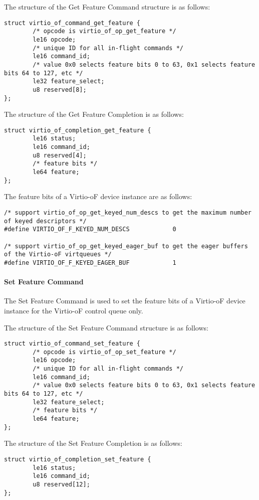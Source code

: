 The structure of the Get Feature Command structure is as follows:
\begin{lstlisting}
struct virtio_of_command_get_feature {
        /* opcode is virtio_of_op_get_feature */
        le16 opcode;
        /* unique ID for all in-flight commands */
        le16 command_id;
        /* value 0x0 selects feature bits 0 to 63, 0x1 selects feature bits 64 to 127, etc */
        le32 feature_select;
        u8 reserved[8];
};
\end{lstlisting}

The structure of the Get Feature Completion is as follows:
\begin{lstlisting}
struct virtio_of_completion_get_feature {
        le16 status;
        le16 command_id;
        u8 reserved[4];
        /* feature bits */
        le64 feature;
};
\end{lstlisting}

The feature bits of a Virtio-oF device instance are as follows:
\begin{lstlisting}
/* support virtio_of_op_get_keyed_num_descs to get the maximum number of keyed descriptors */
#define VIRTIO_OF_F_KEYED_NUM_DESCS            0

/* support virtio_of_op_get_keyed_eager_buf to get the eager buffers of the Virtio-oF virtqueues */
#define VIRTIO_OF_F_KEYED_EAGER_BUF            1
\end{lstlisting}

\paragraph{Set Feature Command}\label{sec:Virtio Transport Options / Virtio Over Fabrics / Commands Definition / Opcodes / Set Feature Command}
The Set Feature Command is used to set the feature bits of a Virtio-oF device instance for the Virtio-oF control queue only.

The structure of the Set Feature Command structure is as follows:
\begin{lstlisting}
struct virtio_of_command_set_feature {
        /* opcode is virtio_of_op_set_feature */
        le16 opcode;
        /* unique ID for all in-flight commands */
        le16 command_id;
        /* value 0x0 selects feature bits 0 to 63, 0x1 selects feature bits 64 to 127, etc */
        le32 feature_select;
        /* feature bits */
        le64 feature;
};
\end{lstlisting}

The structure of the Set Feature Completion is as follows:
\begin{lstlisting}
struct virtio_of_completion_set_feature {
        le16 status;
        le16 command_id;
        u8 reserved[12];
};
\end{lstlisting}

